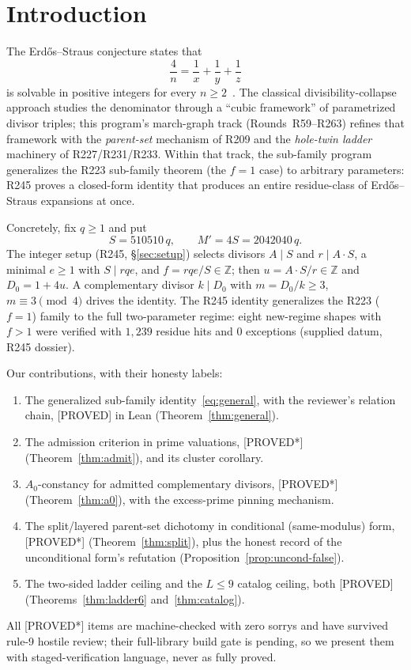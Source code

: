 \documentclass[11pt,a4paper]{article}
\theoremstyle{definition}
\begin{document}
\section{Introduction}

The Erd\H{o}s--Straus conjecture states that
\begin{equation}
  \label{eq:es}
  \frac{4}{n}=\frac{1}{x}+\frac{1}{y}+\frac{1}{z}
\end{equation}
is solvable in positive integers for every $n\ge2$~\cite{ES48,Mor69}.
The classical divisibility-collapse approach studies the denominator
through a ``cubic framework'' of parametrized divisor triples; this
program's march-graph track (Rounds~R59--R263) refines that framework
with the \emph{parent-set} mechanism of R209 and the \emph{hole-twin
ladder} machinery of R227/R231/R233. Within that track, the sub-family
program generalizes the R223 sub-family theorem (the $f=1$ case) to
arbitrary parameters: R245 proves a closed-form identity that produces
an entire residue-class of Erd\H{o}s--Straus expansions at once.

Concretely, fix $q\ge1$ and put
\begin{equation}
  \label{eq:params}
  S=510510\,q,\qquad M'=4S=2042040\,q.
\end{equation}
The integer setup (R245, \S\ref{sec:setup}) selects divisors
$A\mid S$ and $r\mid A\cdot S$, a minimal $e\ge1$ with $S\mid rqe$, and
$f=rqe/S\in\mathbb{Z}$; then $u=A\cdot S/r\in\mathbb{Z}$ and
$D_0=1+4u$. A complementary divisor $k\mid D_0$ with
$m=D_0/k\ge3$, $m\equiv3\pmod4$ drives the identity. The R245 identity
generalizes the R223 ($f=1$) family to the full two-parameter regime:
eight new-regime shapes with $f>1$ were verified with $1{,}239$ residue
hits and $0$ exceptions (supplied datum, R245 dossier).

Our contributions, with their honesty labels:
\begin{enumerate}
\item The generalized sub-family identity~\eqref{eq:general}, with the
  reviewer's relation chain, [PROVED] in Lean (Theorem~\ref{thm:general}).
\item The admission criterion in prime valuations, [PROVED*]
  (Theorem~\ref{thm:admit}), and its cluster corollary.
\item $A_0$-constancy for admitted complementary divisors, [PROVED*]
  (Theorem~\ref{thm:a0}), with the excess-prime pinning mechanism.
\item The split/layered parent-set dichotomy in conditional
  (same-modulus) form, [PROVED*] (Theorem~\ref{thm:split}), plus the
  honest record of the unconditional form's refutation
  (Proposition~\ref{prop:uncond-false}).
\item The two-sided ladder ceiling and the $L\le9$ catalog ceiling,
  both [PROVED] (Theorems~\ref{thm:ladder6} and~\ref{thm:catalog}).
\end{enumerate}
All [PROVED*] items are machine-checked with zero sorrys and have
survived rule-9 hostile review; their full-library build gate is
pending, so we present them with staged-verification language, never as
fully proved.
\end{document}
